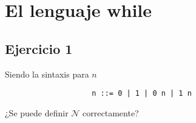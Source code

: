 \chapter{El lenguaje while}
\section{Ejercicio 1}
\begin{enun}
    Siendo la sintaxis para $n$
    \begin{lstlisting}
                    n ::= 0 | 1 | 0 n | 1 n
    \end{lstlisting} 
    ¿Se puede definir $\mathcal{N}$ correctamente?
\end{enun}
